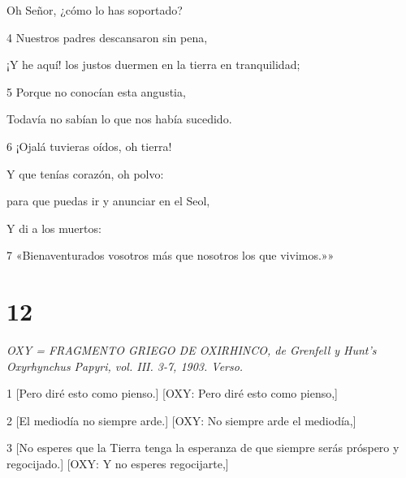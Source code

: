 \par Oh Señor, ¿cómo lo has soportado?

\par 4 Nuestros padres descansaron sin pena,

\par ¡Y he aquí! los justos duermen en la tierra en tranquilidad;

\par 5 Porque no conocían esta angustia,

\par Todavía no sabían lo que nos había sucedido.

\par 6 ¡Ojalá tuvieras oídos, oh tierra!

\par Y que tenías corazón, oh polvo:

\par para que puedas ir y anunciar en el Seol,

\par Y di a los muertos:

\par 7 «Bienaventurados vosotros más que nosotros los que vivimos.»»

\chapter{12}

\par \textit{OXY = FRAGMENTO GRIEGO DE OXIRHINCO, de Grenfell y Hunt's Oxyrhynchus Papyri, vol. III. 3-7, 1903. Verso.}

\par 1 [Pero diré esto como pienso.] [OXY: Pero diré esto como pienso,]

\par [Y hablaré contra ti, tierra que aún prospera.] [OXY: Y hablaré contra ti, tierra que prospera.]

\par 2 [El mediodía no siempre arde.] [OXY: No siempre arde el mediodía,]

\par [Ni los rayos del sol dan luz constantemente.] [OXY: Ni los rayos del sol dan luz constantemente.]

\par 3 [No esperes que la Tierra tenga la esperanza de que siempre serás próspero y regocijado.] [OXY: Y no esperes regocijarte,]

\par [Y no os envanezcáis ni os jactéis mucho.] [OXY: Ni condenéis mucho.]

